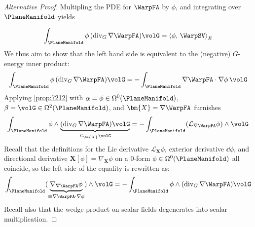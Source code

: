 \begin{proof}[Alternative Proof]
Multipling the PDE for $\WarpFA$ by $\phi$, and integrating over $\PlaneManifold$ yields

$$
\int_{\PlaneManifold} \phi \, (\operatorname{div}_{G}\nabla \WarpFA)  \volG 
= \left<\phi,\, \WarpSV\right>_E
$$
We thus aim to show that the left hand side is equivalent to the (negative) $G$-energy inner product:
$$
\int_{\PlaneManifold} \phi\, (\operatorname{div}_{G} \nabla \WarpFA) \volG
=- \int_{\PlaneManifold} \nabla \WarpFA \cdot \nabla \phi \, \volG 
$$
Applying \cref{prop:7212} with \(\alpha = \phi \in \Omega^0(\PlaneManifold)\), \(\beta = \volG \in \Omega^2(\PlaneManifold)\), and \(\bm{X} = \nabla \WarpFA\) furnishes
\[
\int_{\PlaneManifold} \phi \wedge \underbrace{(
\operatorname{div}_G \nabla \WarpFA
)\volG}_{\mathcal{L}_{\bm{X}}\volG}  = -\int_{\PlaneManifold} (\mathcal{L}_{\nabla \WarpFA} \phi ) \wedge \volG 
\]
Recall that the definitions for the Lie derivative \(\mathcal{L}_{\bm{X}} \phi\), exterior derivative \(\dd \phi\), and directional derivative \(\bm{X}[\phi] = \nabla_{\bm{X}} \phi\) on a 0-form \(\phi \in \Omega^0(\PlaneManifold)\) all coincide, so the left side of the equality is rewritten as:
\[
\int_{\PlaneManifold} (\underbrace{\nabla_{\nabla \WarpFA} \phi}_{\equiv \nabla \WarpFA \cdot \nabla \phi}) \wedge \volG 
= - \int_{\PlaneManifold} \phi \wedge (\operatorname{div}_G \nabla \WarpFA)\volG 
\]
Recall also that the wedge product on scalar fields degenerates into scalar multiplication.
\end{proof}

